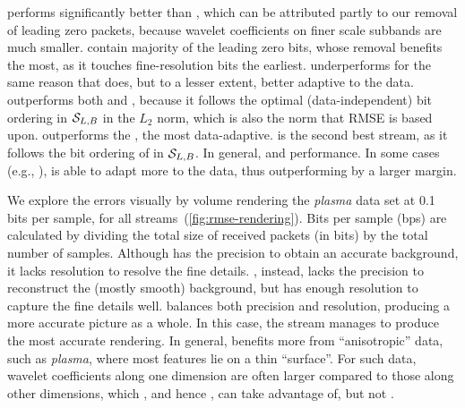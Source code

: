  \sbit performs significantly better than \slvl, which can
be attributed partly to our removal of leading zero packets,  because wavelet coefficients on finer scale subbands are
much smaller.   contain 
 majority of the leading zero bits, whose removal benefits \sbit the
most, as it touches fine-resolution bits the earliest. \smag underperforms for
the same reason that \slvl does, but to a lesser extent, 
 better adaptive to the data. \swav outperforms both
\slvl and \sbit, because it follows the optimal (data-independent) bit ordering
in $\strm_{L,B}$ in the $L_2$ norm, which is also the norm that RMSE is based
upon.  \sopt {} outperforms the
 ,   the most
data-adaptive.  \ssig is the second best stream, as it follows the bit ordering
of \sopt in $\strm_{L,B}$. In general, \swav and \ssig {}
 performance. In some cases (e.g.,
), \ssig is able to adapt more to
the data, thus outperforming \swav by a larger margin. 

We explore the errors visually by volume rendering the \emph{plasma} data set
at 0.1 bits per sample, for all streams~(\autoref{fig:rmse-rendering}). Bits
per sample (bps) are calculated by dividing the total size of received packets
(in bits) by the total number of samples. Although \slvl has the precision to
obtain an accurate background, it lacks resolution to resolve the fine details.
\sbit, instead, lacks the precision to reconstruct the (mostly smooth)
background, but has enough resolution to capture the fine details well. \swav
balances both precision and resolution, producing a more accurate picture as a
whole. In this case, the \ssig stream manages to produce the most accurate
rendering. In general, \ssig benefits more from ``anisotropic'' data, such as
\emph{plasma}, where most features lie on a thin ``surface''. For such data,
wavelet coefficients along one dimension are often larger compared to those
along other dimensions, which \sopt, and hence \ssig, can take advantage of,
but not \swav.
